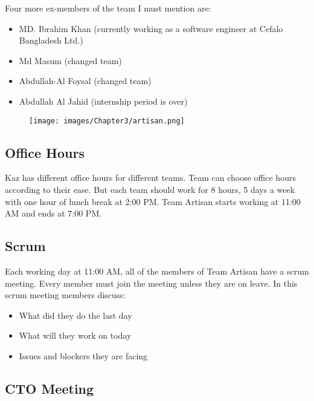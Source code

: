 Four more ex-members of the team I must mention are:

\begin{itemize}
    \item MD. Ibrahim Khan (currently working as a software engineer at Cefalo Bangladesh Ltd.)
    \item Md Masum (changed team)
    \item Abdullah-Al Foysal (changed team)
    \item Abdullah Al Jahid (internship period is over)
\end{itemize}

\begin{figure}[h]
    \begin{center}
        \texttt{[image: images/Chapter3/artisan.png]}
        \label{fig:team_artisan}
    \end{center}
\end{figure}

\subsection{Office Hours}

Kaz has different office hours for different teams.
Team can choose office hours according to their ease.
But each team should work for 8 hours, 5 days a week with one hour of lunch break at 2:00 PM.
Team Artisan starts working at 11:00 AM and ends at 7:00 PM.

\subsection{Scrum}

Each working day at 11:00 AM, all of the members of Team Artisan have a scrum meeting.
Every member must join the meeting unless they are on leave.
In this scrum meeting members discuss:

\begin{itemize}
    \item What did they do the last day
    \item What will they work on today
    \item Issues and blockers they are facing
\end{itemize}

\subsection{CTO Meeting}

